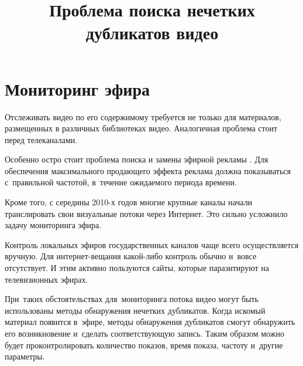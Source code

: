 \documentclass{.local/lib/classes/ndvr-super-article-standalone}
\title[NDVR thesis-abstract]{%
    Проблема поиска нечетких дубликатов видео%
}
\begin{document}
    \section{Мониторинг эфира}

    Отслеживать видео по его содержимому 
    требуется не только для материалов, 
    размещенных в различных библиотеках видео.
    Аналогичная проблема стоит перед телеканалами.

    Особенно остро стоит проблема поиска 
    и замены эфирной рекламы \cite{Huang:2010b,Tan:2009,Yan:2008}.
    Для обеспечения максимального продающего эффекта
    реклама должна показываться с~правильной частотой,
    в~течение ожидаемого периода времени.

    Кроме того, с середины 2010-х годов 
    многие крупные каналы начали транслировать 
    свои визуальные потоки через Интернет. 
    Это сильно усложнило задачу мониторинга эфира. 

    Контроль локальных эфиров государственных каналов
    чаще всего осуществляется вручную.
    Для интернет-вещания какой-либо 
    контроль обычно и~вовсе отсутствует.
    И этим активно пользуются сайты,
    которые паразитируют на телевизионных эфирах.

    При~таких обстоятельствах для~мониторинга потока видео могут
    быть использованы методы обнаружения нечетких дубликатов.
    Когда искомый материал появится в~эфире, 
    методы обнаружения дубликатов смогут обнаружить 
    его возникновение и~сделать соответствующую запись.
    Таким образом можно будет проконтролировать количество показов,
    время показа, частоту и~другие параметры.

\end{document}
